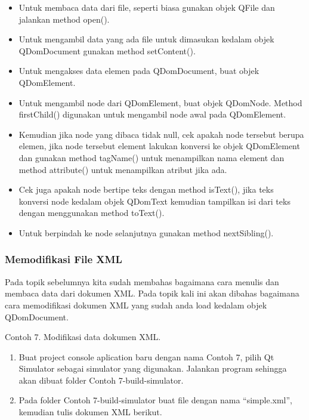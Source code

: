\begin{itemize}
\tightlist
\item
  Untuk membaca data dari file, seperti biasa gunakan objek QFile dan
  jalankan method open().
\item
  Untuk mengambil data yang ada file untuk dimasukan kedalam objek
  QDomDocument gunakan method setContent().
\item
  Untuk mengakses data elemen pada QDomDocument, buat objek QDomElement.
\item
  Untuk mengambil node dari QDomElement, buat objek QDomNode. Method
  firstChild() digunakan untuk mengambil node awal pada QDomElement.
\item
  Kemudian jika node yang dibaca tidak null, cek apakah node tersebut
  berupa elemen, jika node tersebut element lakukan konversi ke objek
  QDomElement dan gunakan method tagName() untuk menampilkan nama
  element dan method attribute() untuk menampilkan atribut jika ada.
\item
  Cek juga apakah node bertipe teks dengan method isText(), jika teks
  konversi node kedalam objek QDomText kemudian tampilkan isi dari teks
  dengan menggunakan method toText().
\item
  Untuk berpindah ke node selanjutnya gunakan method nextSibling().
\end{itemize}

\subsubsection{Memodifikasi File XML}\label{memodifikasi-file-xml}

Pada topik sebelumnya kita sudah membahas bagaimana cara menulis dan
membaca data dari dokumen XML. Pada topik kali ini akan dibahas
bagaimana cara memodifikasi dokumen XML yang sudah anda load kedalam
objek QDomDocument.

Contoh 7. Modifikasi data dokumen XML.

\begin{enumerate}
\def\labelenumi{\arabic{enumi}.}
\tightlist
\item
  Buat project console aplication baru dengan nama Contoh 7, pilih Qt
  Simulator sebagai simulator yang digunakan. Jalankan program sehingga
  akan dibuat folder Contoh 7-build-simulator.
\item
  Pada folder Contoh 7-build-simulator buat file dengan nama
  ``simple.xml'', kemudian tulis dokumen XML berikut.
\end{enumerate}

